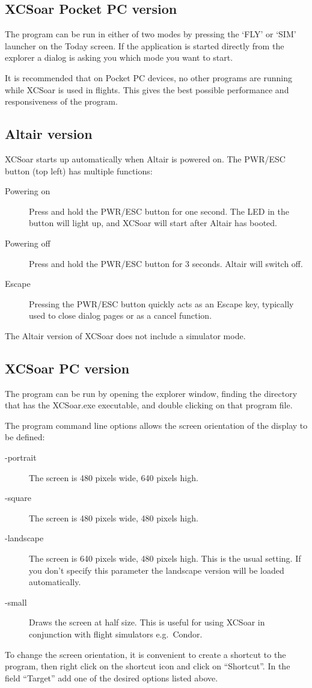 \subsection*{XCSoar Pocket PC version}
The program can be run in either of two modes by pressing the `FLY' or
`SIM' launcher on the Today screen. If the application is started directly from
the explorer a dialog is asking you which mode you want to start.

\tip It is recommended that on Pocket PC devices, no other programs
 are running while XCSoar is used in flights.  This gives the best
 possible performance and responsiveness of the program.

\subsection*{Altair version}
XCSoar starts up automatically when Altair is powered on.
The PWR/ESC button (top left) has multiple functions:
\begin{description}
\item[Powering on]  Press and hold the PWR/ESC button for one second.
  The LED in the button will light up, and XCSoar will start after
  Altair has booted.
\item[Powering off]  Press and hold the PWR/ESC button for 3 seconds.
  Altair will switch off.
\item[Escape] Pressing the PWR/ESC button quickly acts as an
Escape key, typically used to close dialog pages or as a cancel function.
\end{description}

The Altair version of XCSoar does not include a simulator mode.

\subsection*{XCSoar PC version}
The program can be run by opening the explorer window, finding the directory
that has the XCSoar.exe executable, and double clicking on that program file.

The program command line options allows the screen orientation of
the display to be defined:
\begin{description}
\item[-portrait] The screen is 480 pixels wide, 640 pixels high.
\item[-square] The screen is 480 pixels wide, 480 pixels high.
\item[-landscape] The screen is 640 pixels wide, 480 pixels high. This is the
usual setting. If you don't specify this parameter the landscape version will be
loaded automatically.
\item[-small] Draws the screen at half size.  This is useful for using XCSoar in
 conjunction with flight simulators e.g.\ Condor.
\end{description}
To change the screen orientation, it is convenient to create a shortcut to the
program, then right click on the shortcut icon and click on ``Shortcut''. 
In the field ``Target'' add one of the desired options listed above.


